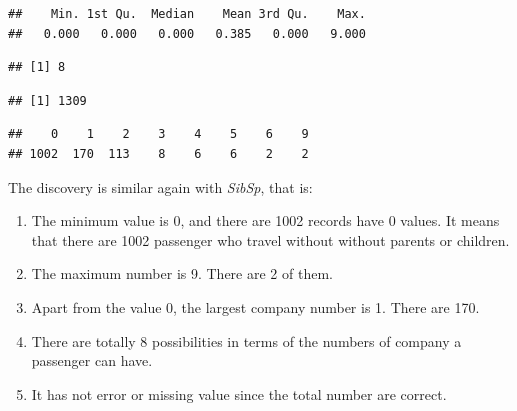 \documentclass[
]{book}
\newenvironment{Shaded}{\begin{snugshade}}{\end{snugshade}}
\newcommand{\CommentTok}[1]{\textcolor[rgb]{0.56,0.35,0.01}{\textit{#1}}}
\newcommand{\KeywordTok}[1]{\textcolor[rgb]{0.13,0.29,0.53}{\textbf{#1}}}
\newcommand{\NormalTok}[1]{#1}
\newcommand{\OperatorTok}[1]{\textcolor[rgb]{0.81,0.36,0.00}{\textbf{#1}}}
\newcommand{\StringTok}[1]{\textcolor[rgb]{0.31,0.60,0.02}{#1}}
\providecommand{\tightlist}{%
  \setlength{\itemsep}{0pt}\setlength{\parskip}{0pt}}
\begin{document}
\begin{verbatim}
##    Min. 1st Qu.  Median    Mean 3rd Qu.    Max. 
##   0.000   0.000   0.000   0.385   0.000   9.000
\end{verbatim}

\begin{Shaded}
\end{Shaded}

\begin{verbatim}
## [1] 8
\end{verbatim}

\begin{Shaded}
\end{Shaded}

\begin{verbatim}
## [1] 1309
\end{verbatim}

\begin{Shaded}
\end{Shaded}

\begin{verbatim}
##    0    1    2    3    4    5    6    9 
## 1002  170  113    8    6    6    2    2
\end{verbatim}

The discovery is similar again with \emph{SibSp}, that is:

\begin{enumerate}
\def\labelenumi{\arabic{enumi}.}
\tightlist
\item
  The minimum value is 0, and there are 1002 records have 0 values. It means that there are 1002 passenger who travel without without parents or children.
\item
  The maximum number is 9. There are 2 of them.
\item
  Apart from the value 0, the largest company number is 1. There are 170.
\item
  There are totally 8 possibilities in terms of the numbers of company a passenger can have.
\item
  It has not error or missing value since the total number are correct.
\end{enumerate}
\end{document}
